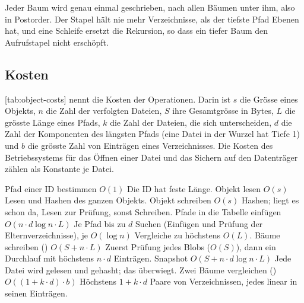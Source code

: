 Jeder Baum wird genau einmal geschrieben, nach allen Bäumen unter ihm, also in Postorder.
Der Stapel hält nie mehr Verzeichnisse, als der tiefste Pfad Ebenen hat,
und eine Schleife ersetzt die Rekursion, so dass ein tiefer Baum den Aufrufstapel nicht erschöpft.

\subsection[sec:object-costs]{Kosten}

[tab:object-costs] nennt die Kosten der Operationen.
Darin ist $s$ die Grösse eines Objekts, $n$ die Zahl der verfolgten Dateien,
$S$ ihre Gesamtgrösse in Bytes, $L$ die grösste Länge eines Pfads,
$k$ die Zahl der Dateien, die sich unterscheiden, $d$ die Zahl der Komponenten
des längsten Pfads (eine Datei in der Wurzel hat Tiefe 1)
und $b$ die grösste Zahl von Einträgen eines Verzeichnisses.
Die Kosten des Betriebssystems für das Öffnen einer Datei und das Sichern auf den Datenträger
zählen als Konstante je Datei.

\startplacetable[title={Kosten der Operationen auf Objekten},reference=tab:object-costs,
  location=here]
\startxtable[frame=off,option=stretch]
\startxrow[topframe=on,bottomframe=on]
 \stopxcell
{} \stopxcell
{} \stopxcell
\stopxrow
\startxrow
\startxcell Pfad einer ID bestimmen \stopxcell
\startxcell $O(1)$ \stopxcell
\startxcell Die ID hat feste Länge. \stopxcell
\stopxrow
\startxrow
\startxcell Objekt lesen \stopxcell
\startxcell $O(s)$ \stopxcell
\startxcell Lesen und Hashen des ganzen Objekts. \stopxcell
\stopxrow
\startxrow
\startxcell Objekt schreiben \stopxcell
\startxcell $O(s)$ \stopxcell
\startxcell Hashen; liegt es schon da, Lesen zur Prüfung, sonst Schreiben. \stopxcell
\stopxrow
\startxrow
\startxcell Pfade in die Tabelle einfügen \stopxcell
\startxcell $O(n \cdot d \log n \cdot L)$ \stopxcell
\startxcell Je Pfad bis zu $d$ Suchen (Einfügen und Prüfung der Elternverzeichnisse),
je $O(\log n)$ Vergleiche zu höchstens $O(L)$. \stopxcell
\stopxrow
\startxrow
\startxcell Bäume schreiben () \stopxcell
\startxcell $O(S + n \cdot L)$ \stopxcell
\startxcell Zuerst Prüfung jedes Blobs ($O(S)$), dann ein Durchlauf
mit höchstens $n \cdot d$ Einträgen. \stopxcell
\stopxrow
\startxrow
\startxcell Snapshot \stopxcell
\startxcell $O(S + n \cdot d \log n \cdot L)$ \stopxcell
\startxcell Jede Datei wird gelesen und gehasht; das überwiegt. \stopxcell
\stopxrow
\startxrow[bottomframe=on]
\startxcell Zwei Bäume vergleichen () \stopxcell
\startxcell $O((1 + k \cdot d) \cdot b)$ \stopxcell
\startxcell Höchstens $1 + k \cdot d$ Paare von Verzeichnissen,
jedes linear in seinen Einträgen. \stopxcell
\stopxrow
\stopxtable
\stopplacetable

